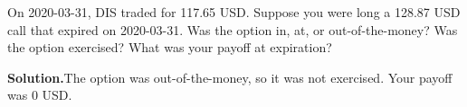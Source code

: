 \noindent On 2020-03-31, DIS traded for 117.65 USD. Suppose you were long a 128.87 USD call that expired on 2020-03-31. Was the option in, at, or out-of-the-money? Was the option exercised? What was your payoff at expiration?

\vspace{9pt} 

\textbf{Solution.}The option was out-of-the-money, so it was not exercised. Your payoff was 0 USD.